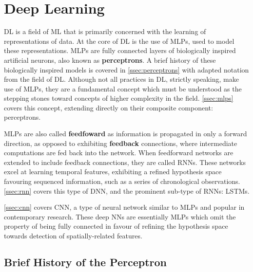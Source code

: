 \section{Deep Learning\label{sec:DL}}
\Gls{DL} is a field of \gls{ML} that is primarily concerned with the learning of
representations of data. At the core of \gls{DL} is the use of \glspl{MLP}, used
to model these representations. \Glspl{MLP} are fully connected layers of
biologically inspired artificial neurons, also known as \textbf{perceptrons}. A
brief history of these biologically inspired models is covered in
\autoref{ssec:perceptrons} with adapted notation from the field of \gls{DL}.
Although not all practices in \gls{DL}, strictly speaking, make use of
\glspl{MLP}, they are a fundamental concept which must be understood as the
stepping stones toward concepts of higher complexity in the field.
\autoref{ssec:mlps} covers this concept, extending directly on their composite
component: perceptrons.

\Glspl{MLP} are also called \textbf{feedfoward} as information is propagated in only a forward direction, as opposed to exhibiting \textbf{feedback} connections, where intermediate computations are fed back into the network. When feedforward networks are extended to include feedback connections, they are called \glspl{RNN}. These networks excel at learning temporal features, exhibiting a refined hypothesis space favouring sequenced information, such as a series of chronological observations. \autoref{ssec:rnn} covers this type of \gls{DNN}, and the prominent sub-type of \glspl{RNN}: \glspl{LSTM}.

\autoref{ssec:cnn} covers \gls{CNN}, a type of neural network similar to \glspl{MLP} and popular in contemporary research. These deep \glspl{NN} are essentially \glspl{MLP} which omit the property of being fully connected in favour of refining the hypothesis space towards detection of spatially-related features.


\subsection{Brief History of the Perceptron}\label{ssec:perceptrons}

